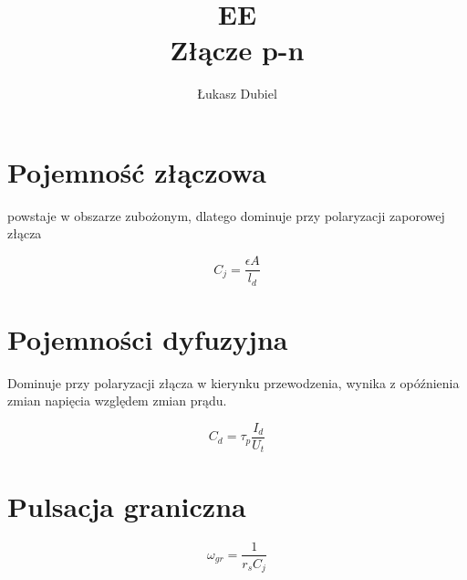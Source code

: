 \documentclass[11pt]{article}
\author{Łukasz Dubiel}
\title{EE \\ Złącze p-n}
\begin{document}
\maketitle

\section{Pojemność złączowa}
powstaje w obszarze zubożonym, dlatego dominuje przy polaryzacji zaporowej złącza

$$ C_j = \frac{\epsilon A}{l_d} $$

\section{Pojemności dyfuzyjna}
Dominuje przy polaryzacji złącza w kierynku przewodzenia, wynika z opóźnienia zmian napięcia względem zmian prądu.

$$ C_d = \tau_p \frac{I_d}{U_t} $$

\section{Pulsacja graniczna}
$$ \omega_{gr} = \frac{1}{r_s C_j} $$
\end{document}
